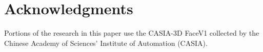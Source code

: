 \section*{Acknowledgments}

Portions of the research in this paper use the CASIA-3D FaceV1 collected by the Chinese Academy of Sciences' Institute of Automation (CASIA).